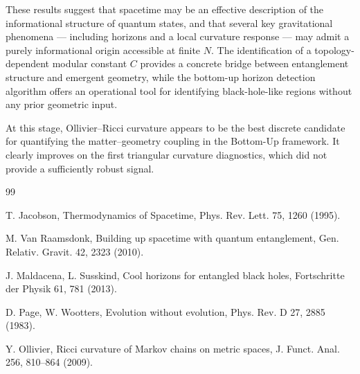 \documentclass[11pt]{article}
\begin{document}
These results suggest that spacetime may be an effective description of the informational structure of quantum states, and that several key gravitational phenomena --- including horizons and a local curvature response --- may admit a purely informational origin accessible at finite $N$. The identification of a topology-dependent modular constant $C$ provides a concrete bridge between entanglement structure and emergent geometry, while the bottom-up horizon detection algorithm offers an operational tool for identifying black-hole-like regions without any prior geometric input.

At this stage, Ollivier--Ricci curvature appears to be the best discrete candidate for quantifying the matter--geometry coupling in the Bottom-Up framework. It clearly improves on the first triangular curvature diagnostics, which did not provide a sufficiently robust signal.

\begin{thebibliography}{99}

T. Jacobson,
Thermodynamics of Spacetime,
Phys. Rev. Lett. 75, 1260 (1995).

M. Van Raamsdonk,
Building up spacetime with quantum entanglement,
Gen. Relativ. Gravit. 42, 2323 (2010).

J. Maldacena, L. Susskind,
Cool horizons for entangled black holes,
Fortschritte der Physik 61, 781 (2013).

D. Page, W. Wootters,
Evolution without evolution,
Phys. Rev. D 27, 2885 (1983).

Y. Ollivier,
Ricci curvature of Markov chains on metric spaces,
J. Funct. Anal. 256, 810--864 (2009).

\end{thebibliography}
\end{document}
